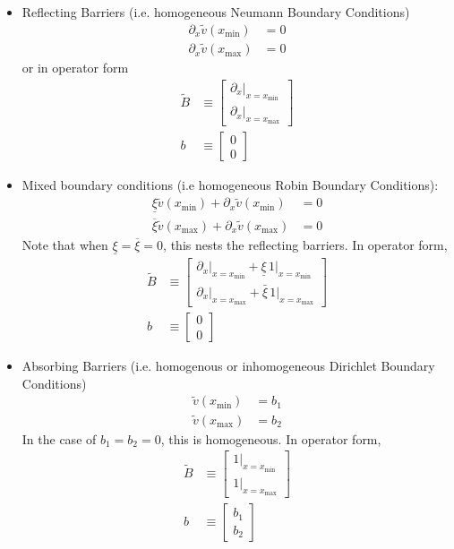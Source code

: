 \documentclass[11pt]{article}
\newcommand{\D}[1][]{\ensuremath{\partial_{#1}}}
\theoremstyle{definition}
\begin{document}
\begin{itemize}
	\item Reflecting Barriers (i.e. homogeneous Neumann Boundary Conditions)
	\begin{align}
		\D[x]\tilde{v}({x_{\min}} ) &= 0\label{eq:reflecting-BC1}\\
		\D[x]\tilde{v}({x_{\max}}) &= 0\label{eq:reflecting-BC2}
	\end{align}
	or in operator form
	\begin{align}
		\tilde{B} &\equiv \begin{bmatrix}
		\partial_x\vert_{x = x_{\min}}\\
		\partial_x\vert_{x = x_{\max}}
		\end{bmatrix}\\
		b &\equiv \begin{bmatrix} 0\\ 0 \end{bmatrix}
	\end{align}
	\item Mixed boundary conditions (i.e homogeneous Robin Boundary Conditions):
	\begin{align}
	\underline{\xi} \tilde{v}({x_{\min}}) + \D[x]\tilde{v}({x_{\min}} ) &= 0\label{eq:mixed-BC1}\\
	\overline{\xi} \tilde{v}({x_{\max}}) + \D[x]\tilde{v}({x_{\max}}) &= 0\label{eq:mixed-BC2}
	\end{align}
	Note that when $\underline{\xi} = \overline{\xi} = 0$, this nests the reflecting barriers.  In operator form,
	\begin{align}
		\tilde{B} &\equiv \begin{bmatrix}
		\partial_x\vert_{x = x_{\min}} + \underline{\xi}\,1 \vert_{x = x_{\min}}\\
		\partial_x\vert_{x = x_{\max}} + \bar{\xi}\,1 \vert_{x = x_{\max}}
		\end{bmatrix}\\
		b &\equiv \begin{bmatrix} 0\\ 0 \end{bmatrix}
	\end{align}
	\item Absorbing Barriers (i.e. homogenous or inhomogeneous Dirichlet Boundary Conditions)
	\begin{align}
		\tilde{v}({x_{\min}} ) &= b_1\label{eq:absorbing-BC1}\\
		\tilde{v}({x_{\max}}) &= b_2\label{eq:absorbing-BC2}
	\end{align}
	In the case of $b_1 = b_2 = 0$, this is homogeneous. In operator form,
	\begin{align}
		\tilde{B} &\equiv \begin{bmatrix}
		1 \vert_{x = x_{\min}}\\
		1 \vert_{x = x_{\max}}
		\end{bmatrix}\\
		b &\equiv \begin{bmatrix} b_1\\ b_2 \end{bmatrix}
	\end{align}
\end{itemize}
\end{document}
